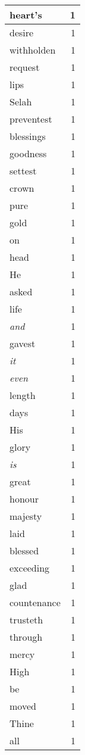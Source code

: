 \begin{center}
\begin{longtable}{l|r}
heart's & 1 \\ \hline
desire & 1 \\ \hline
withholden & 1 \\ \hline
request & 1 \\ \hline
lips & 1 \\ \hline
Selah & 1 \\ \hline
preventest & 1 \\ \hline
blessings & 1 \\ \hline
goodness & 1 \\ \hline
settest & 1 \\ \hline
crown & 1 \\ \hline
pure & 1 \\ \hline
gold & 1 \\ \hline
on & 1 \\ \hline
head & 1 \\ \hline
He & 1 \\ \hline
asked & 1 \\ \hline
life & 1 \\ \hline
\emph{and} & 1 \\ \hline
gavest & 1 \\ \hline
\emph{it} & 1 \\ \hline
\emph{even} & 1 \\ \hline
length & 1 \\ \hline
days & 1 \\ \hline
His & 1 \\ \hline
glory & 1 \\ \hline
\emph{is} & 1 \\ \hline
great & 1 \\ \hline
honour & 1 \\ \hline
majesty & 1 \\ \hline
laid & 1 \\ \hline
blessed & 1 \\ \hline
exceeding & 1 \\ \hline
glad & 1 \\ \hline
countenance & 1 \\ \hline
trusteth & 1 \\ \hline
through & 1 \\ \hline
mercy & 1 \\ \hline
High & 1 \\ \hline
be & 1 \\ \hline
moved & 1 \\ \hline
Thine & 1 \\ \hline
all & 1 \\ \hline

\end{longtable}
\end{center}
